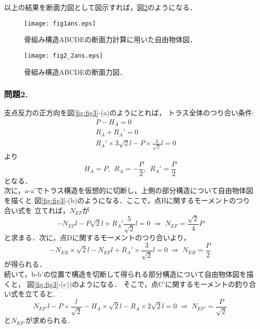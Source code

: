 \documentclass[10pt,a4j]{jarticle}
\begin{document}
以上の結果を断面力図として図示すれば，図\ref{fig:fig2}のようになる．
\begin{figure}[h]
	\begin{center}
	\texttt{[image: fig1ans.eps]} 
	\end{center}
	\caption{骨組み構造ABCDEの断面力計算に用いた自由物体図．} 
	\label{fig:fig1}
\end{figure}
\begin{figure}[h]
	\begin{center}
	\texttt{[image: fig2\_2ans.eps]} 
	\end{center}
	\caption{骨組み構造ABCDEの断面力図．} 
	\label{fig:fig2}
\end{figure}
\subsubsection*{問題2.}
支点反力の正方向を図\ref{fig:fig3}-(a)のようにとれば，
トラス全体のつり合い条件:
\begin{eqnarray}
	&& P-H_A=0  \\
	&& R_A+R_A'=0 \\  
	&& R_A'\times 3\sqrt{2}l - P \times \frac{3}{\sqrt{2}}l=0 
\end{eqnarray}
より
\begin{equation}
	H_A=P, \ \ 
	R_A=-\frac{P}{2}, \ \ 
	R_A'=\frac{P}{2}
\end{equation}
となる．\\

次に，a-a'でトラス構造を仮想的に切断し，上側の部分構造について自由物体図を描くと
図\ref{fig:fig3}-(b)のようになる．ここで，点Bに関するモーメントのつり合い式を
立てれば，$N_{EF}$が
\begin{equation}
	-N_{EF}l-P\sqrt{2}l + R_A'\frac{5}{\sqrt{2}}l =0
	\; \Rightarrow \;
	N_{EF}=\frac{\sqrt{2}}{4}P
\end{equation}
と求まる．次に，点Dに関するモーメントのつり合いより，
\begin{equation}
	-N_{EB}\times \sqrt{2}l -N_{EF}l +R_A'\times \frac{3}{\sqrt{2}}l=0
	\; \Rightarrow \;
	N_{EB}=\frac{P}{2}
\end{equation}
が得られる．\\

続いて，b-b'の位置で構造を切断して得られる部分構造について自由物体図を描くと，
図\ref{fig:fig3}-(c))のようになる．
そこで，点C'に関するモーメントの釣り合い式を立てると,
\begin{equation}
	N_{EF'}l-P\times \frac{l}{\sqrt{2}}-H_A\times \sqrt{2}l-R_A\times 2\sqrt{2}l =0 \;
	\Rightarrow \; 
	N_{EF'}=\frac{P}{\sqrt{2}}
\end{equation}
と$N_{EF'}$が求められる.
\end{document}
